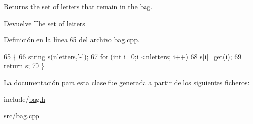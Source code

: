 Returns the set of letters that remain in the bag. 

\begin{DoxyReturn}{Devuelve}
The set of letters 
\end{DoxyReturn}


Definición en la línea 65 del archivo bag.\+cpp.


\begin{DoxyCode}
65                              \{
66     \textcolor{keywordtype}{string} s(nletters,\textcolor{charliteral}{'-'});
67     \textcolor{keywordflow}{for} (\textcolor{keywordtype}{int} i=0;i <nletters; i++)
68         s[i]=\textcolor{keyword}{get}(i);
69     \textcolor{keywordflow}{return} s;
70 \}
\end{DoxyCode}


La documentación para esta clase fue generada a partir de los siguientes ficheros\+:\begin{DoxyCompactItemize}
\item 
include/\hyperlink{bag_8h}{bag.\+h}\item 
src/\hyperlink{bag_8cpp}{bag.\+cpp}\end{DoxyCompactItemize}
